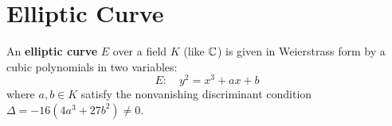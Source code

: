\documentclass[11pt,openany]{article}
\begin{document}
%
%
%
%

\newpage
\section{Elliptic Curve}
An \textbf{elliptic curve} $E$ over a field $K$ (like $\mathbb{C}$) is given in Weierstrass form by a cubic polynomials in two variables: \[
E:\quad y^2=x^3+ax+b
\] where $a,b\in K$ satisfy the nonvanishing discriminant condition $\Delta=-16(4a^3+27b^2)\neq 0$.
\end{document}
